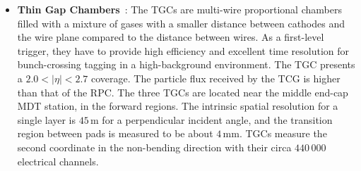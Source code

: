 \begin{itemize}
	\item \textbf{Thin Gap Chambers}~\cite{Nagai:1996mf}: 
		The TGCs are multi-wire proportional chambers filled with a mixture of gases with a
		smaller distance between cathodes and the wire plane compared to the distance between wires.
		As a first-level trigger, they have to 
		provide high efficiency and excellent time resolution for bunch-crossing tagging in a 
		high-background environment. The TGC presents a $2.0 < |\eta| < 2.7$  
		coverage. The particle flux received by the TCG is higher than that of the RPC.
		The three TGCs are located near the middle end-cap MDT station, in the forward regions.
		The intrinsic spatial resolution for a single layer is $45\,$\textmu m for a perpendicular incident angle, 
		and the transition region between pads is measured to be about $4\,$mm.
		TGCs measure the second coordinate in the non-bending direction with their circa $440\,000$ electrical channels.
\end{itemize}
 



